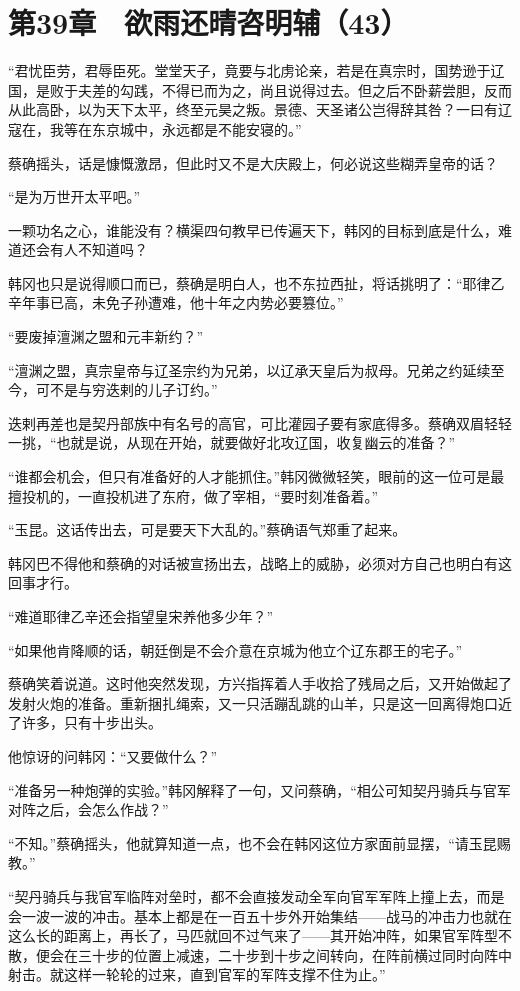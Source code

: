 \section{第39章　欲雨还晴咨明辅（43）}

“君忧臣劳，君辱臣死。堂堂天子，竟要与北虏论亲，若是在真宗时，国势逊于辽国，是败于夫差的勾践，不得已而为之，尚且说得过去。但之后不卧薪尝胆，反而从此高卧，以为天下太平，终至元昊之叛。景德、天圣诸公岂得辞其咎？一曰有辽寇在，我等在东京城中，永远都是不能安寝的。”

蔡确摇头，话是慷慨激昂，但此时又不是大庆殿上，何必说这些糊弄皇帝的话？

“是为万世开太平吧。”

一颗功名之心，谁能没有？横渠四句教早已传遍天下，韩冈的目标到底是什么，难道还会有人不知道吗？

韩冈也只是说得顺口而已，蔡确是明白人，也不东拉西扯，将话挑明了：“耶律乙辛年事已高，未免子孙遭难，他十年之内势必要篡位。”

“要废掉澶渊之盟和元丰新约？”

“澶渊之盟，真宗皇帝与辽圣宗约为兄弟，以辽承天皇后为叔母。兄弟之约延续至今，可不是与穷迭剌的儿子订约。”

迭剌再差也是契丹部族中有名号的高官，可比灌园子要有家底得多。蔡确双眉轻轻一挑，“也就是说，从现在开始，就要做好北攻辽国，收复幽云的准备？”

“谁都会机会，但只有准备好的人才能抓住。”韩冈微微轻笑，眼前的这一位可是最擅投机的，一直投机进了东府，做了宰相，“要时刻准备着。”

“玉昆。这话传出去，可是要天下大乱的。”蔡确语气郑重了起来。

韩冈巴不得他和蔡确的对话被宣扬出去，战略上的威胁，必须对方自己也明白有这回事才行。

“难道耶律乙辛还会指望皇宋养他多少年？”

“如果他肯降顺的话，朝廷倒是不会介意在京城为他立个辽东郡王的宅子。”

蔡确笑着说道。这时他突然发现，方兴指挥着人手收拾了残局之后，又开始做起了发射火炮的准备。重新捆扎绳索，又一只活蹦乱跳的山羊，只是这一回离得炮口近了许多，只有十步出头。

他惊讶的问韩冈：“又要做什么？”

“准备另一种炮弹的实验。”韩冈解释了一句，又问蔡确，“相公可知契丹骑兵与官军对阵之后，会怎么作战？”

“不知。”蔡确摇头，他就算知道一点，也不会在韩冈这位方家面前显摆，“请玉昆赐教。”

“契丹骑兵与我官军临阵对垒时，都不会直接发动全军向官军军阵上撞上去，而是会一波一波的冲击。基本上都是在一百五十步外开始集结——战马的冲击力也就在这么长的距离上，再长了，马匹就回不过气来了——其开始冲阵，如果官军阵型不散，便会在三十步的位置上减速，二十步到十步之间转向，在阵前横过同时向阵中射击。就这样一轮轮的过来，直到官军的军阵支撑不住为止。”

